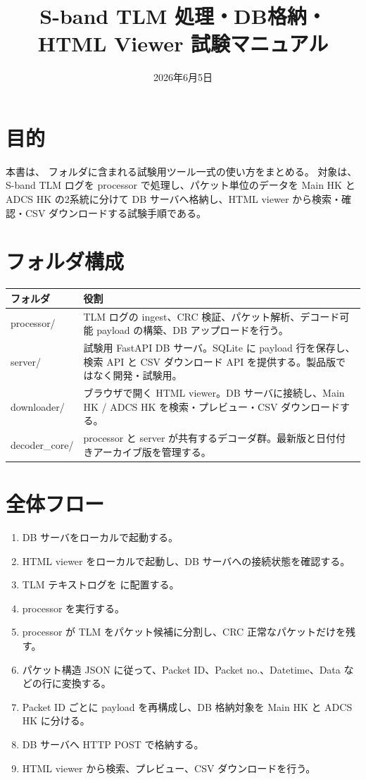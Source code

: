 \documentclass[a4paper,11pt]{ltjsarticle}
\title{S-band TLM 処理・DB格納・HTML Viewer 試験マニュアル}
\author{}
\date{2026年6月5日}
\begin{document}
\maketitle

\section{目的}

本書は、 フォルダに含まれる試験用ツール一式の使い方をまとめる。
対象は、S-band TLM ログを processor で処理し、パケット単位のデータを Main HK と ADCS HK の2系統に分けて DB サーバへ格納し、HTML viewer から検索・確認・CSV ダウンロードする試験手順である。

\section{フォルダ構成}

\begin{center}
\begin{tabular}{>{\ttfamily}p{36mm}p{112mm}}
\toprule
フォルダ & 役割 \\
\midrule
processor/ & TLM ログの ingest、CRC 検証、パケット解析、デコード可能 payload の構築、DB アップロードを行う。 \\
server/ & 試験用 FastAPI DB サーバ。SQLite に payload 行を保存し、検索 API と CSV ダウンロード API を提供する。製品版ではなく開発・試験用。 \\
downloader/ & ブラウザで開く HTML viewer。DB サーバに接続し、Main HK / ADCS HK を検索・プレビュー・CSV ダウンロードする。 \\
decoder\_core/ & processor と server が共有するデコーダ群。最新版と日付付きアーカイブ版を管理する。 \\
\bottomrule
\end{tabular}
\end{center}

\section{全体フロー}

\begin{enumerate}
  \item DB サーバをローカルで起動する。
  \item HTML viewer をローカルで起動し、DB サーバへの接続状態を確認する。
  \item TLM テキストログを  に配置する。
  \item processor を実行する。
  \item processor が TLM をパケット候補に分割し、CRC 正常なパケットだけを残す。
  \item パケット構造 JSON に従って、Packet ID、Packet no.、Datetime、Data などの行に変換する。
  \item Packet ID ごとに payload を再構成し、DB 格納対象を Main HK と ADCS HK に分ける。
  \item DB サーバへ HTTP POST で格納する。
  \item HTML viewer から検索、プレビュー、CSV ダウンロードを行う。
\end{enumerate}
\end{document}
